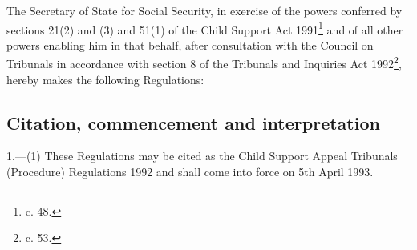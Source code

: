 \documentclass[12pt,a4paper]{article}
\title{\regstitle}
\author{S.I. 1992 No. 2641}
\date{Made 26th October 1992\\Laid before Parliament 29th October 1992\\Coming into force 5th April 1993}
\begin{document}
\maketitle

\noindent
The Secretary of State for Social Security, in exercise of the powers conferred by sections 21(2) and (3) and 51(1) of the Child Support Act 1991\footnote{ c. 48.} and of all other powers enabling him in that behalf, after consultation with the Council on Tribunals in accordance with section 8 of the Tribunals and Inquiries Act 1992\footnote{ c. 53.}, hereby makes the following Regulations:

{\sloppy

\tableofcontents

}

\setcounter{secnumdepth}{-2}

\subsection[1. Citation, commencement and interpretation]{Citation, commencement and interpretation}

1.—(1) These Regulations may be cited as the Child Support Appeal Tribunals (Procedure) Regulations 1992 and shall come into force on 5th April 1993.
\end{document}

